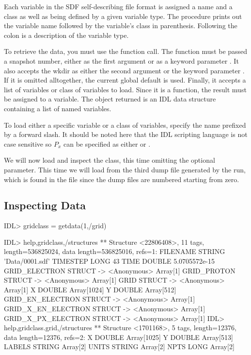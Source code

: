  Each variable in the SDF self-describing file format is assigned a
  name and a class as well as being defined by a given variable type.
  The  procedure prints out the variable name followed
  by the variable's class in parenthesis. Following the colon is a
  description of the variable type.

  To retrieve the data, you must use the  function call.
  The function must be passed a snapshot number, either as the first argument
  or as a keyword parameter . It also accepts the wkdir as
  either the second argument or the keyword parameter . If it is
  omitted alltogether, the current global default is used. Finally, it accepts
  a list of variables or class of variables to load.
  Since it is a function, the result must be assigned to a
  variable. The object returned is an IDL data structure containing a list
  of named variables.

  To load either a specific variable or a class of variables, specify the
  name prefixed by a forward slash. It should be noted here that the IDL
  scripting language is not case sensitive so $P_x$ can be specified as
  either  or .

  We will now load and inspect the  class, this time omitting
  the optional  parameter. This time we will load from the
  third dump file generated by the {\EPOCH} run, which is found in the
  file  since the dump files are numbered starting from zero.
%
\pagebreak
\subsection{Inspecting Data}

\begin{boxverbatim}
IDL> gridclass = getdata(1,/grid)

IDL> help,gridclass,/structures
** Structure <22806408>, 11 tags, length=536825024, data length=536825016, refs=1:
   FILENAME        STRING    'Data/0001.sdf'
   TIMESTEP        LONG                43
   TIME            DOUBLE       5.0705572e-15
   GRID_ELECTRON   STRUCT    -> <Anonymous> Array[1]
   GRID_PROTON     STRUCT    -> <Anonymous> Array[1]
   GRID            STRUCT    -> <Anonymous> Array[1]
   X               DOUBLE    Array[1024]
   Y               DOUBLE    Array[512]
   GRID_EN_ELECTRON
                   STRUCT    -> <Anonymous> Array[1]
   GRID_X_EN_ELECTRON
                   STRUCT    -> <Anonymous> Array[1]
   GRID_X_PX_ELECTRON
                   STRUCT    -> <Anonymous> Array[1]
IDL> help,gridclass.grid,/structures
** Structure <1701168>, 5 tags, length=12376, data length=12376, refs=2:
   X               DOUBLE    Array[1025]
   Y               DOUBLE    Array[513]
   LABELS          STRING    Array[2]
   UNITS           STRING    Array[2]
   NPTS            LONG      Array[2]
\end{boxverbatim}

